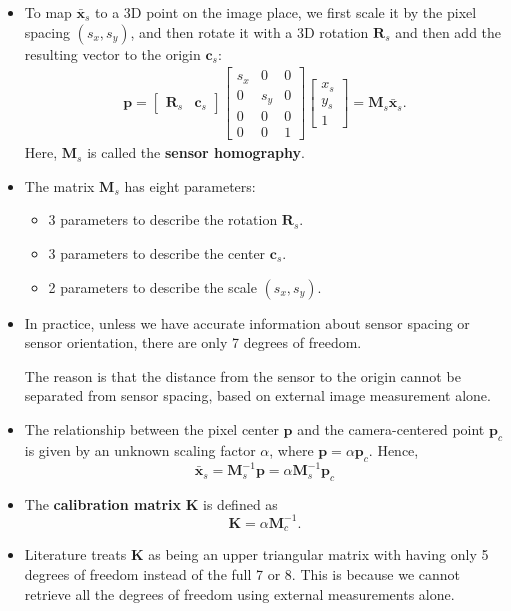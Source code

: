 \documentclass[10pt]{article}
\newcommand{\ve}[1]{\mathbf{#1}}
\begin{document}
\begin{itemize}
	  \item To map $\bar{\ve{x}}_s$ to a 3D point on the image place, we first scale it by
	    the pixel spacing $(s_x, s_y)$, and then rotate it with a 3D rotation $\ve{R}_s$ and
	    then add the resulting vector to the origin $\ve{c}_s$:
	    \begin{align*}
	      \ve{p} = \left[ \begin{array}{c|c} \ve{R}_s & \ve{c}_s \end{array} \right]
	        \begin{bmatrix}
	          s_x & 0 & 0\\
	          0 & s_y & 0\\
	          0 & 0 & 0\\
	          0 & 0 & 1
	        \end{bmatrix}
	        \begin{bmatrix}
	          x_s \\ y_s \\ 1
	        \end{bmatrix}
	        = \ve{M}_s \bar{\ve{x}}_s.
	    \end{align*}
	    Here, $\ve{M}_s$ is called the {\bf sensor homography}.
	    
	  \item The matrix $\ve{M}_s$ has eight parameters:
	    \begin{itemize}
	      \item 3 parameters to describe the rotation $\ve{R}_s$.
	      \item 3 parameters to describe the center $\ve{c}_s$.
	      \item 2 parameters to describe the scale $(s_x, s_y)$.
	    \end{itemize}
	    
	  \item In practice, unless we have accurate information about
	    sensor spacing or sensor orientation, there are only 
	    7 degrees of freedom.
	    
	    The reason is that the distance from the sensor to the origin
	    cannot be separated from sensor spacing, based on 
	    external image measurement alone.
	    	  
	  \item The relationship between the pixel center $\ve{p}$ and
	    the camera-centered point $\ve{p}_c$ is given by an unknown 
	    scaling factor $\alpha$, where $\ve{p} = \alpha \ve{p}_c$.
	    Hence,
	    $$\bar{\ve{x}}_s = \ve{M}_s^{-1} \ve{p} = \alpha \ve{M}_s^{-1} \ve{p}_c $$
	    
	  \item The {\bf calibration matrix} $\ve{K}$ is defined as
	    $$\ve{K} = \alpha \ve{M}_c^{-1}.$$
	    
	  \item Literature treats $\ve{K}$ as being an upper triangular matrix 
	    with having only 5 degrees of freedom instead
	    of the full 7 or 8. This is because we cannot retrieve all the
	    degrees of freedom using external measurements alone.	  
  \end{itemize}		
  
\end{document}
